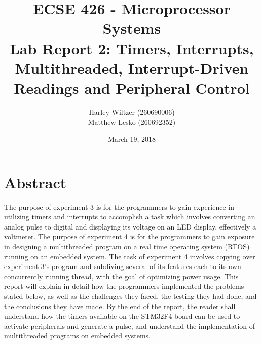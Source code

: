 \documentclass[12pt]{report}
\title{ECSE 426 - Microprocessor Systems\\Lab Report 2: Timers, Interrupts, Multithreaded, Interrupt-Driven Readings and Peripheral Control}
\author{Harley Wiltzer (260690006)\\Matthew Lesko (260692352)}
\date{March 19, 2018}
\begin{document}
\maketitle
{}
\tableofcontents
\listoffigures
\let\clearpage\relax
\listoftables
\newpage
{}
\section{Abstract}
The purpose of experiment 3 is for the programmers to gain experience in utilizing timers and
interrupts to accomplish a task which involves converting an analog pulse to digital and displaying
its voltage on an LED display, effectively a voltmeter. The purpose of experiment 4 is for the
programmers to gain exposure in designing a multithreaded program on a real time operating system
(RTOS) running on an embedded system. The task of experiment 4 involves copying over experiment 3's
program and subdiving several of its features each to its own concurrently running thread, with the
goal of optimizing power usage. This report will explain in detail how the programmers implemented
the problems stated below, as well as the challenges they faced, the testing they had done, and the
conclusions they have made. By the end of the report, the reader shall understand how the timers
available on the STM32F4 board can be used to activate peripherals and generate a pulse, and
understand the implementation of multithreaded programs on embedded systems.
\end{document}
